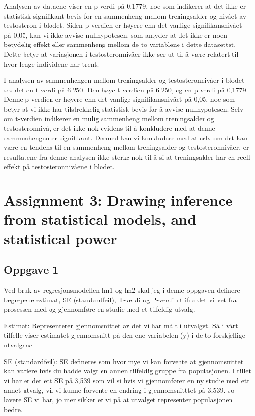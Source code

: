 \documentclass[
  letterpaper,
  DIV=11,
  numbers=noendperiod]{scrreprt}
\begin{document}
Analysen av dataene viser en p-verdi på 0,1779, noe som indikerer at det
ikke er statistisk signifikant bevis for en sammenheng mellom
treningsalder og nivået av testosteron i blodet. Siden p-verdien er
høyere enn det vanlige signifikansnivået på 0,05, kan vi ikke avvise
nullhypotesen, som antyder at det ikke er noen betydelig effekt eller
sammenheng mellom de to variablene i dette datasettet. Dette betyr at
variasjonen i testosteronnivåer ikke ser ut til å være relatert til hvor
lenge individene har trent.

I analysen av sammenhengen mellom treningsalder og testosteronnivåer i
blodet ses det en t-verdi på 6.250. Den høye t-verdien på 6.250, og en
p-verdi på 0,1779. Denne p-verdien er høyere enn det vanlige
signifikansnivået på 0,05, noe som betyr at vi ikke har tilstrekkelig
statistisk bevis for å avvise nullhypotesen. Selv om t-verdien indikerer
en mulig sammenheng mellom treningsalder og testosteronnivå, er det ikke
nok evidens til å konkludere med at denne sammenhengen er signifikant.
Dermed kan vi konkludere med at selv om det kan være en tendens til en
sammenheng mellom treningsalder og testosteronnivåer, er resultatene fra
denne analysen ikke sterke nok til å si at treningsalder har en reell
effekt på testosteronnivåene i blodet.


\chapter{Assignment 3: Drawing inference from statistical models, and
statistical
power}\label{assignment-3-drawing-inference-from-statistical-models-and-statistical-power}

\section{Oppgave 1}\label{oppgave-1}

Ved bruk av regresjonsmodellen lm1 og lm2 skal jeg i denne oppgaven
definere begrepene estimat, SE (standardfeil), T-verdi og P-verdi ut
ifra det vi vet fra prosessen med og gjennomføre en studie med et
tilfeldig utvalg.

Estimat: Representerer gjennomsnittet av det vi har målt i utvalget. Så
i vårt tilfelle viser estimatet gjennomsnitt på den ene variabelen (y) i
de to forskjellige utvalgene.

SE (standardfeil): SE defineres som hvor mye vi kan forvente at
gjennomsnittet kan variere hvis du hadde valgt en annen tilfeldig gruppe
fra populasjonen. I tillet vi har er det ett SE på 3,539 som vil si hvis
vi gjennomfører en ny studie med ett annet utvalg, vil vi kunne forvente
en endring i gjennomsnitttet på 3,539. Jo lavere SE vi har, jo mer
sikker er vi på at utvalget representer populasjonen bedre.
\end{document}
